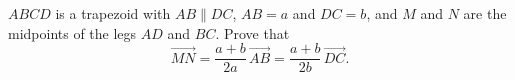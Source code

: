 $ABCD$ is a trapezoid with $AB\parallel DC$, $AB=a$ and $DC=b$, and $M$ and $N$ are the midpoints of the legs $AD$ and $BC$. Prove that
\[\overrightarrow{MN}=\dfrac{a+b}{2a}\,\overrightarrow{AB}=\dfrac{a+b}{2b}\,\overrightarrow{DC}.\]
